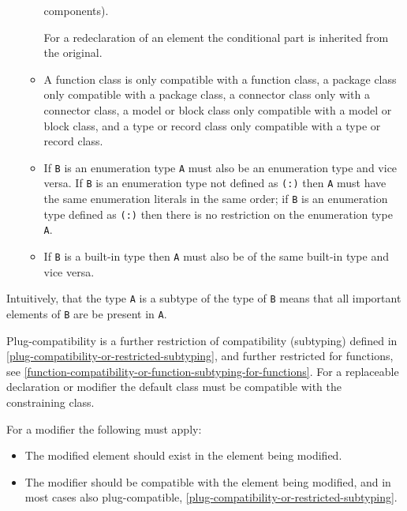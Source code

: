 \begin{itemize}
\begin{itemize}
    components).
    \begin{nonnormative}
    For a redeclaration of an element the conditional part is inherited from the original.
    \end{nonnormative}
  \item
    A function class is only compatible with a function class, a package
    class only compatible with a package class, a connector class only
    with a connector class, a model or block class only compatible with
    a model or block class, and a type or record class only compatible
    with a type or record class.
  \item
    If \lstinline!B! is an enumeration type \lstinline!A! must also be an enumeration type and
    vice versa. If \lstinline!B! is an enumeration type not defined as \lstinline!(:)! then \lstinline!A!
    must have the same enumeration literals in the same order; if \lstinline!B! is
    an enumeration type defined as \lstinline!(:)! then there is no restriction on
    the enumeration type \lstinline!A!.
  \item
    If \lstinline!B! is a built-in type then \lstinline!A! must also be of the same built-in
    type and vice versa.
  \end{itemize}
\end{itemize}

\begin{nonnormative}
Intuitively, that the type \lstinline!A! is a subtype of the type of \lstinline!B! means that all important elements of \lstinline!B! are be present in \lstinline!A!.
\end{nonnormative}

Plug-compatibility is a further restriction of compatibility (subtyping)
defined in \autoref{plug-compatibility-or-restricted-subtyping}, and further restricted for functions, see
\autoref{function-compatibility-or-function-subtyping-for-functions}. For a replaceable declaration or modifier the default class
must be compatible with the constraining class.

For a modifier the following must apply:
\begin{itemize}
\item
  The modified element should exist in the element being modified.
\item
  The modifier should be compatible with the element being modified, and
  in most cases also plug-compatible, \autoref{plug-compatibility-or-restricted-subtyping}.
\end{itemize}

